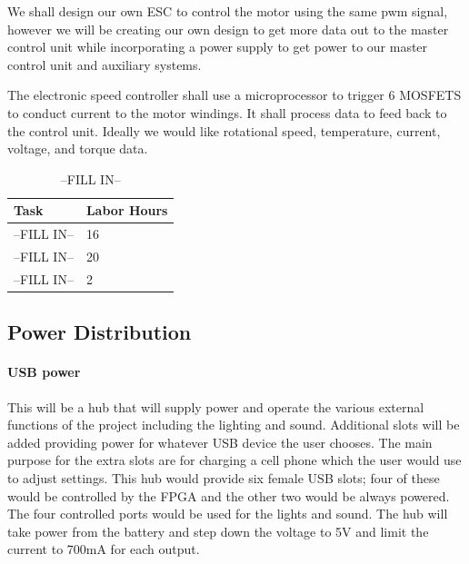 \documentclass[12pt,article]{IEEEtran}
\begin{document}
            We shall design our own ESC to control the motor using the same pwm signal, however we will be 
            creating our own design to get more data out to the master control unit while incorporating a 
            power supply to get power to our master control unit and auxiliary systems.

            The electronic speed controller shall use a microprocessor to trigger 6 MOSFETS to conduct current 
            to the motor windings. It shall process data to feed back to the control unit. Ideally we would like 
            rotational speed, temperature, current, voltage, and torque data.


       \begin{table}[H]        
            \renewcommand{\arraystretch}{1.3}
                \caption{--FILL IN--}
                
                \label{Estimated Time}
                
                \centering
                \begin{tabular}{p{5.5cm}|p{2cm}}
                \hline
                \bfseries   Task                        & \bfseries Labor Hours                         \\
                \hline\hline
                            --FILL IN--                 & 16                                            \\
                            --FILL IN--                 & 20                                            \\  
                            --FILL IN--                 & 2                                             \\  
                            \hline
                \end{tabular}
        \end{table}
        


    \subsection{\bfseries Power Distribution}
        \paragraph{\bfseries USB power}
            This will be a hub that will supply power and operate the various external functions of the 
            project including the lighting and sound. Additional slots will be added providing power for 
            whatever USB device the user chooses.  The main purpose for the extra slots are for charging a 
            cell phone which the user would use to adjust settings. This hub would provide six female USB 
            slots; four of these would be controlled by the FPGA and the other two would be always powered.
            The four controlled ports would be used for the lights and sound. The hub will take power from 
            the battery and step down the voltage to 5V and limit the current to 700mA for each output.
\end{document}
